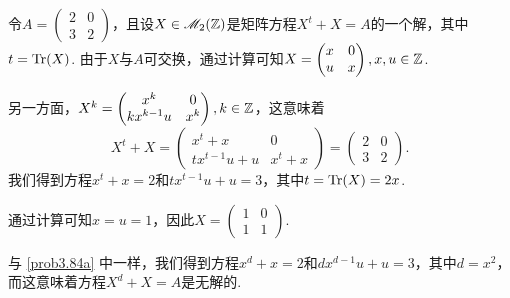 \begin{solution}
  \begin{inparaenum}[(a)]
    \item 令$A=\begin{pmatrix}
      2 & 0 \\
      3 & 2
    \end{pmatrix}$，且设$X\in\mathscr M_2(\mathbb Z)$是矩阵方程$X^t+X=A$的一个解，其中$t=\operatorname{Tr}(X)$. 由于$X$与$A$可交换，通过计算可知$X=\begin{pmatrix}
      x & 0 \\
      u & x
    \end{pmatrix},x,u\in\mathbb Z$.

    另一方面，$X^k=\begin{pmatrix}
      x^k & 0 \\
      kx^{k-1}u & x^k
    \end{pmatrix},k\in\mathbb Z$，这意味着
    \[
      X^t + X = \begin{pmatrix}
        x^t + x & 0 \\
        tx^{t-1}u + u & x^t + x
      \end{pmatrix} = \begin{pmatrix}
      2 & 0 \\
      3 & 2
    \end{pmatrix}.
    \]
    我们得到方程$x^t+x=2$和$tx^{t-1}u+u=3$，其中$t=\operatorname{Tr}(X)=2x$.

    通过计算可知$x=u=1$，因此$X=\begin{pmatrix}
      1 & 0 \\
      1 & 1
    \end{pmatrix}$.

    \item 与 \ref{prob3.84a} 中一样，我们得到方程$x^d+x=2$和$dx^{d-1}u+u=3$，其中$d=x^2$，而这意味着方程$X^d+X=A$是无解的.
  \end{inparaenum}
\end{solution}

